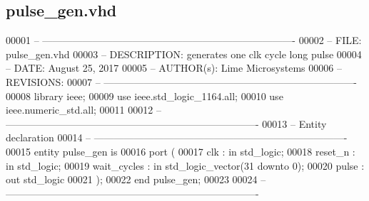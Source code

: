 \subsection{pulse\+\_\+gen.\+vhd}
\label{pulse__gen_8vhd_source}

\begin{DoxyCode}
00001 \textcolor{keyword}{-- ---------------------------------------------------------------------------- }
00002 \textcolor{keyword}{-- FILE: pulse\_gen.vhd}
00003 \textcolor{keyword}{-- DESCRIPTION: generates one clk cycle long pulse }
00004 \textcolor{keyword}{-- DATE: August 25, 2017}
00005 \textcolor{keyword}{-- AUTHOR(s): Lime Microsystems}
00006 \textcolor{keyword}{-- REVISIONS:}
00007 \textcolor{keyword}{-- ---------------------------------------------------------------------------- }
00008 \textcolor{vhdlkeyword}{library }\textcolor{keywordflow}{ieee};
00009 \textcolor{vhdlkeyword}{use }ieee.std\_logic\_1164.\textcolor{keywordflow}{all};
00010 \textcolor{vhdlkeyword}{use }ieee.numeric\_std.\textcolor{keywordflow}{all};
00011 
00012 \textcolor{keyword}{-- ----------------------------------------------------------------------------}
00013 \textcolor{keyword}{-- Entity declaration}
00014 \textcolor{keyword}{-- ----------------------------------------------------------------------------}
00015 \textcolor{keywordflow}{entity }pulse_gen \textcolor{keywordflow}{is}
00016    \textcolor{keywordflow}{port} \textcolor{vhdlchar}{(}
00017       \textcolor{vhdlchar}{clk}         \textcolor{vhdlchar}{:} \textcolor{keywordflow}{in} \textcolor{comment}{std\_logic};
00018       \textcolor{vhdlchar}{reset_n}     \textcolor{vhdlchar}{:} \textcolor{keywordflow}{in} \textcolor{comment}{std\_logic};
00019       \textcolor{vhdlchar}{wait_cycles} \textcolor{vhdlchar}{:} \textcolor{keywordflow}{in} \textcolor{comment}{std\_logic\_vector}\textcolor{vhdlchar}{(}\textcolor{vhdllogic}{}\textcolor{vhdllogic}{31} \textcolor{keywordflow}{downto} \textcolor{vhdllogic}{}\textcolor{vhdllogic}{0}\textcolor{vhdlchar}{)};
00020       \textcolor{vhdlchar}{pulse}       \textcolor{vhdlchar}{:} \textcolor{keywordflow}{out} \textcolor{comment}{std\_logic}
00021    \textcolor{vhdlchar}{)};
00022 \textcolor{keywordflow}{end} \textcolor{vhdlchar}{pulse\_gen};
00023 
00024 \textcolor{keyword}{-- ----------------------------------------------------------------------------}

\end{DoxyCode}
